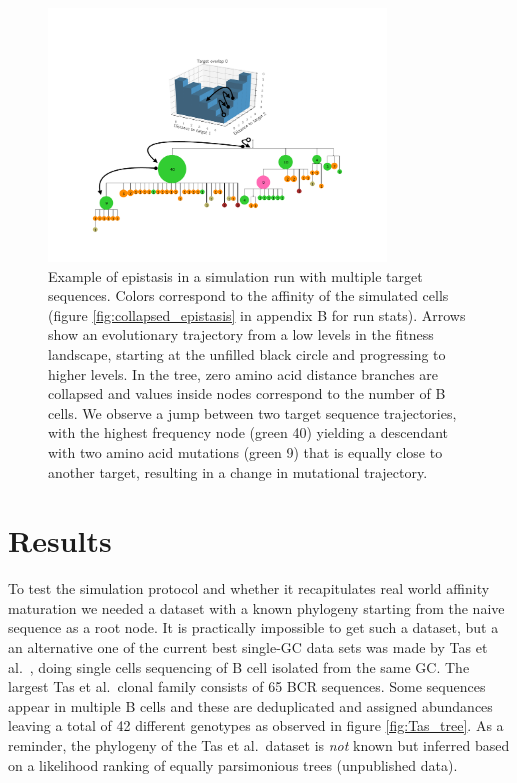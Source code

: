 \begin{figure}[!ht]
    \begin{center}
    \includegraphics[width=0.8\textwidth]{figures/epistasis_figure.pdf}
        \caption{
        \label{fig:epistasis_figure}
        Example of epistasis in a simulation run with multiple target sequences.
        Colors correspond to the affinity of the simulated cells (figure \ref{fig:collapsed_epistasis} in appendix B for run stats).
        Arrows show an evolutionary trajectory from a low levels in the fitness landscape, starting at the unfilled black circle and progressing to higher levels.
        In the tree, zero amino acid distance branches are collapsed and values inside nodes correspond to the number of B cells.
        We observe a jump between two target sequence trajectories, with the highest frequency node (green 40) yielding a descendant with two amino acid mutations (green 9) that is equally close to another target, resulting in a change in mutational trajectory.
        }
    \end{center}
\end{figure}








\section{Results}
To test the simulation protocol and whether it recapitulates real world affinity maturation we needed a dataset with a known phylogeny starting from the naive sequence as a root node.
It is practically impossible to get such a dataset, but a an alternative one of the current best single-GC data sets was made by Tas et al.\ \cite{tas2016visualizing}, doing single cells sequencing of B cell isolated from the same GC.
The largest Tas et al.\ clonal family consists of 65 BCR sequences.
Some sequences appear in multiple B cells and these are deduplicated and assigned abundances leaving a total of 42 different genotypes as observed in figure \ref{fig:Tas_tree}.
As a reminder, the phylogeny of the Tas et al.\ dataset is \textit{not} known but inferred based on a likelihood ranking of equally parsimonious trees (unpublished data).

